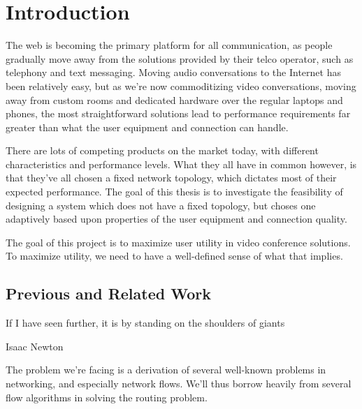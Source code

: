 \chapter{Introduction}\label{chp:introduction}

The web is becoming the primary platform for all communication, as people gradually move away from the solutions provided by their telco operator, such as telephony and text messaging. Moving audio conversations to the Internet has been relatively easy, but as we're now commoditizing video conversations, moving away from custom rooms and dedicated hardware over the regular laptops and phones, the most straightforward solutions lead to performance requirements far greater than what the user equipment and connection can handle.

There are lots of competing products on the market today, with different characteristics and performance levels. What they all have in common however, is that they've all chosen a fixed network topology, which dictates most of their expected performance. The goal of this thesis is to investigate the feasibility of designing a system which does not have a fixed topology, but choses one adaptively based upon properties of the user equipment and connection quality.


The goal of this project is to maximize user utility in video conference solutions. To maximize utility, we need to have a well-defined sense of what that implies.

\section{Previous and Related Work}

\epigraph{If I have seen further, it is by standing on the shoulders of giants}{Isaac Newton}

The problem we're facing is a derivation of several well-known problems in networking, and especially network flows. We'll thus borrow heavily from several flow algorithms in solving the routing problem.




